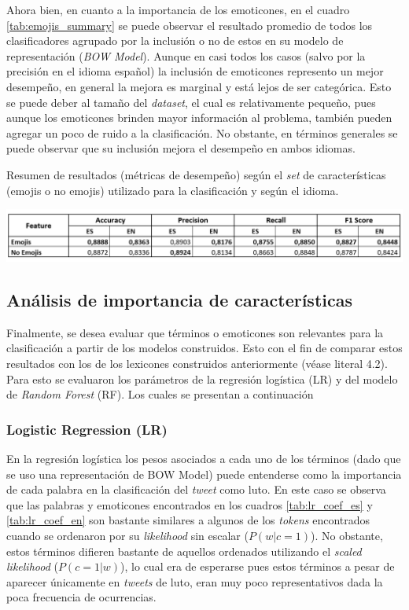 Ahora bien, en cuanto a la importancia de los emoticones, en el cuadro \ref{tab:emojis_summary} se puede observar el resultado promedio de todos los clasificadores agrupado por la inclusión o no de estos en su modelo de representación (\textit{BOW Model}). Aunque en casi todos los casos (salvo por la precisión en el idioma español) la inclusión de emoticones represento un mejor desempeño, en general la mejora es marginal y está lejos de ser categórica. Esto se puede deber al tamaño del \textit{dataset}, el cual es relativamente pequeño, pues aunque los emoticones brinden mayor información al problema, también pueden agregar un poco de ruido a la clasificación. No obstante, en términos generales se puede observar que su inclusión mejora el desempeño en ambos idiomas. 

\begin{table}[H]
    \centering
    \caption{Resumen de resultados (métricas de desempeño) según el \textit{set} de características (emojis o no emojis) utilizado para la clasificación y según el idioma.}
    \label{tab:emojis_summary}
    \includegraphics[width=\textwidth]{doc/images/summary_results_emoji.png}
\end{table}

\subsection{Análisis de importancia de características}

Finalmente, se desea evaluar que términos o emoticones son relevantes para la clasificación a partir de los modelos construidos. Esto con el fin de comparar estos resultados con los de los lexicones construidos anteriormente (véase literal 4.2). Para esto se evaluaron los parámetros de la regresión logística (LR) y del modelo de \textit{Random Forest} (RF). Los cuales se presentan a continuación

\subsubsection{Logistic Regression (LR)}

En la regresión logística los pesos asociados a cada uno de los términos (dado que se uso una representación de BOW Model) puede entenderse como la importancia de cada palabra en la clasificación del \textit{tweet} como luto. En este caso se observa que las palabras y emoticones encontrados en los cuadros \ref{tab:lr_coef_es} y \ref{tab:lr_coef_en} son bastante similares a algunos de los \textit{tokens} encontrados cuando se ordenaron por su \textit{likelihood} sin escalar ($P(w|c=1)$). No obstante, estos términos difieren bastante de aquellos ordenados utilizando el \textit{scaled likelihood} ($P(c=1|w)$), lo cual era de esperarse pues estos términos a pesar de aparecer únicamente en \textit{tweets} de luto, eran muy poco representativos dada la poca frecuencia de ocurrencias.

